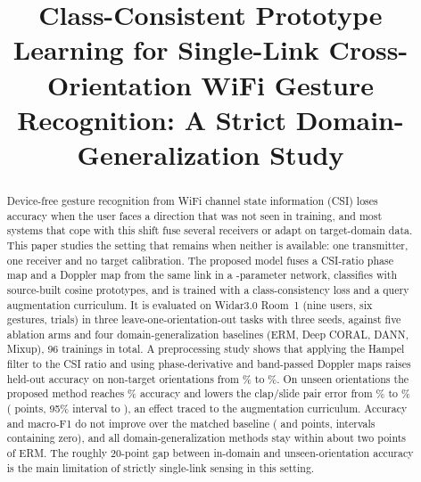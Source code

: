 \documentclass[conference]{IEEEtran}
\begin{document}
\title{Class-Consistent Prototype Learning for Single-Link Cross-Orientation WiFi Gesture Recognition: A Strict Domain-Generalization Study}

\author{
\and
{}
}

\maketitle

\begin{abstract}
Device-free gesture recognition from WiFi channel state information (CSI) loses accuracy when the user faces a direction that was not seen in training, and most systems that cope with this shift fuse several receivers or adapt on target-domain data. This paper studies the setting that remains when neither is available: one transmitter, one receiver and no target calibration. The proposed model fuses a CSI-ratio phase map and a Doppler map from the same link in a \CfiveParams-parameter network, classifies with source-built cosine prototypes, and is trained with a class-consistency loss and a query augmentation curriculum. It is evaluated on Widar3.0 Room~1 (nine users, six gestures, \NValid{} trials) in three leave-one-orientation-out tasks with three seeds, against five ablation arms and four domain-generalization baselines (ERM, Deep CORAL, DANN, Mixup), 96 trainings in total. A preprocessing study shows that applying the Hampel filter to the CSI ratio and using phase-derivative and band-passed Doppler maps raises held-out accuracy on non-target orientations from \GateOrig\% to \GateLocked\%. On unseen orientations the proposed method reaches \CfiveAcc\% accuracy and lowers the clap/slide pair error from \ConeCS\% to \CfiveCS\% (\DFiveOneCS{} points, 95\% interval \DFiveOneCSLo{} to \DFiveOneCSHi), an effect traced to the augmentation curriculum. Accuracy and macro-F1 do not improve over the matched baseline (\DFiveOneAcc{} and \DFiveOneFone{} points, intervals containing zero), and all domain-generalization methods stay within about two points of ERM. The roughly 20-point gap between in-domain and unseen-orientation accuracy is the main limitation of strictly single-link sensing in this setting.
\end{abstract}
\end{document}
